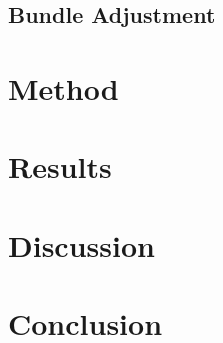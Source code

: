 \documentclass{article}
\begin{document}
\subsection{Bundle Adjustment}


\section{Method}

\section{Results}

\section{Discussion}

\section{Conclusion}
\end{document}
